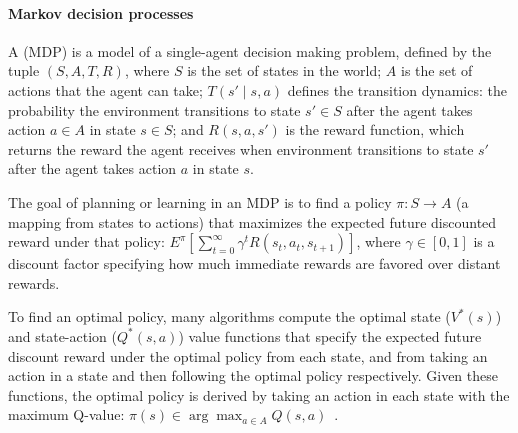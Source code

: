 
\vspace{\up}
\paragraph{Markov decision processes}

A  (MDP) is a model of a single-agent
decision making problem, defined by the tuple $(S, A, T, R)$, where
$S$ is the set of states in the world; $A$ is the set of actions that
the agent can take; $T(s' \mid s, a)$ defines the transition dynamics:
the probability the environment transitions to state $s' \in S$
after the agent takes action $a \in A$ in state $s \in S$; and 
$R(s, a, s')$ is the reward function, which returns the reward the
agent receives when environment transitions to state $s'$ after the
agent takes action $a$ in state $s$.

The goal of planning or learning in an MDP is to find a policy $\pi :
S \rightarrow A$ (a mapping from states to actions) that maximizes the
expected future discounted reward under that policy: $E^{\pi} \left[
  \sum_{t=0}^\infty \gamma^t R(s_t, a_t, s_{t+1}) \right]$, where
$\gamma \in [0, 1]$ is a discount factor specifying how much immediate
rewards are favored over distant rewards. 

To find an optimal policy, many algorithms compute the optimal state
($V^*(s)$) and state-action ($Q^*(s,a)$) value functions that specify
the expected future discount reward under the optimal policy from each
state, and from taking an action in a state and then following the
optimal policy respectively. 
Given these functions, the optimal policy is derived by taking an
action in each state with the maximum Q-value: 
$\pi(s) \in \arg\max_{a \in A} Q(s, a)$~\cite{bertsekas87}.

